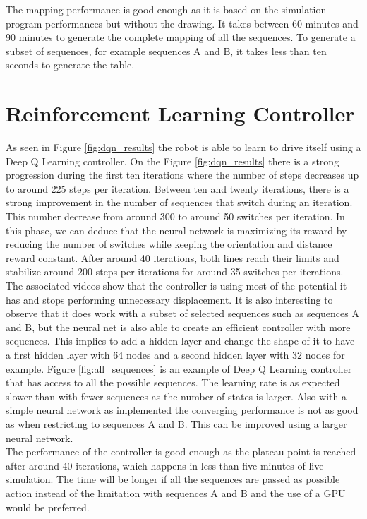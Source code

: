         The mapping performance is good enough as it is based on the simulation program performances but without the drawing. It takes between 60 minutes and 90 minutes to generate the complete mapping of all the sequences. To generate a subset of sequences, for example sequences A and B, it takes less than ten seconds to generate the table.
        
    \section{Reinforcement Learning Controller}
        As seen in Figure \ref{fig:dqn_results} the robot is able to learn to drive itself using a Deep Q Learning controller. On the Figure \ref{fig:dqn_results} there is a strong progression during the first ten iterations where the number of steps decreases up to around 225 steps per iteration. Between ten and twenty iterations, there is a strong improvement in the number of sequences that switch during an iteration. This number decrease from around 300 to around 50 switches per iteration. In this phase, we can deduce that the neural network is maximizing its reward by reducing the number of switches while keeping the orientation and distance reward constant. After around 40 iterations, both lines reach their limits and stabilize around 200 steps per iterations for around 35 switches per iterations.\\
        
        The associated videos show that the controller is using most of the potential it has and stops performing unnecessary displacement. It is also interesting to observe that it does work with a subset of selected sequences such as sequences A and B, but the neural net is also able to create an efficient controller with more sequences. This implies to add a hidden layer and change the shape of it to have a first hidden layer with 64 nodes and a second hidden layer with 32 nodes for example. Figure \ref{fig:all_sequences} is an example of Deep Q Learning controller that has access to all the possible sequences. The learning rate is as expected slower than with fewer sequences as the number of states is larger. Also with a simple neural network as implemented the converging performance is not as good as when restricting to sequences A and B. This can be improved using a larger neural network.\\
        
        The performance of the controller is good enough as the plateau point is reached after around 40 iterations, which happens in less than five minutes of live simulation. The time will be longer if all the sequences are passed as possible action instead of the limitation with sequences A and B and the use of a GPU would be preferred.
        